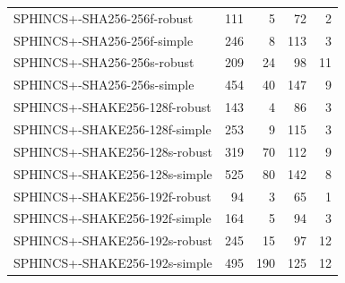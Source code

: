\documentclass[a4paper,12pt]{article}
\begin{document}
\begin{table}[]
\begin{tabular}{@{}lrrrr@{}}
SPHINCS+-SHA256-256f-robust   & 111                                     & 5                        & 72                                        & 2                          \\
SPHINCS+-SHA256-256f-simple   & 246                                     & 8                         & 113                                       & 3                        \\
SPHINCS+-SHA256-256s-robust   & 209                                         & 24                        & 98                                        & 11                        \\
SPHINCS+-SHA256-256s-simple   & 454                                     & 40                        & 147                                       & 9                         \\ \hline
SPHINCS+-SHAKE256-128f-robust & 143                                     & 4                          & 86                                        & 3                        \\
SPHINCS+-SHAKE256-128f-simple & 253                                     & 9                         & 115                                        & 3                          \\
SPHINCS+-SHAKE256-128s-robust & 319                                     & 70                         & 112                                       & 9                       \\
SPHINCS+-SHAKE256-128s-simple & 525                                         & 80                        & 142                                       & 8                         \\
SPHINCS+-SHAKE256-192f-robust & 94                                      & 3                          & 65                                        & 1                         \\
SPHINCS+-SHAKE256-192f-simple & 164                                    & 5                          & 94                                        & 3                       \\
SPHINCS+-SHAKE256-192s-robust & 245                                        & 15                         & 97                                        & 12                         \\
SPHINCS+-SHAKE256-192s-simple & 495                                         & 190                        & 125                                       & 12                        \\

\end{tabular}
\end{table}
\end{document}
